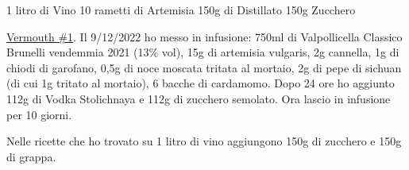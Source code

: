 \serves{-}%
\cooktime[]{-}%
\begin{ingreds}
	1 litro di Vino
	10 rametti di Artemisia
	150g di Distillato
	150g Zucchero



\end{ingreds}


\begin{method}
\underline{Vermouth \#1}. Il 9/12/2022 ho messo in infusione: 750ml di Valpollicella Classico Brunelli vendemmia 2021 (13\% vol), 15g di artemisia vulgaris, 2g cannella, 1g di chiodi di garofano, 0,5g di noce moscata tritata al mortaio, 2g di pepe di sichuan (di cui 1g tritato al mortaio), 6 bacche di cardamomo. Dopo 24 ore ho aggiunto 112g di Vodka Stolichnaya e 112g di zucchero semolato. Ora lascio in infusione per 10 giorni.

Nelle ricette che ho trovato su 1 litro di vino aggiungono 150g di zucchero e 150g di grappa.


\end{method}





